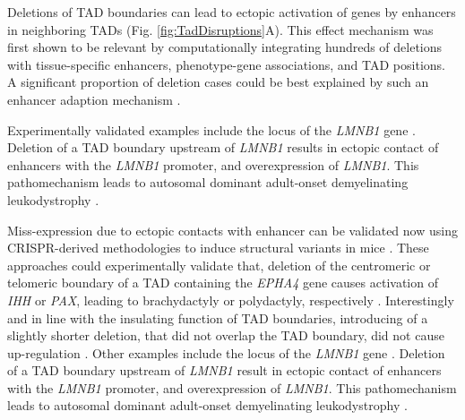 \documentclass[a4paper,twoside=true,openright,parskip=full,chapterprefix=true,11pt,headings=normal,bibliography=totoc,listof=totoc,titlepage=on,captions=tableabove,draft=false]{scrreprt}
\theoremstyle{definition}
\theoremstyle{definition}
\theoremstyle{definition}
\theoremstyle{remark}
\begin{document}
Deletions of TAD boundaries can lead to ectopic activation of genes by
enhancers in neighboring TADs (Fig. \ref{fig:TadDisruptions}A). This
effect mechanism was first shown to be relevant by computationally
integrating hundreds of deletions with tissue-specific enhancers,
phenotype-gene associations, and TAD positions. A significant proportion
of deletion cases could be best explained by such an enhancer adaption
mechanism \citep{Ibn-Salem2014}.

Experimentally validated examples include the locus of the \emph{LMNB1}
gene \citep{Giorgio2015}. Deletion of a TAD boundary upstream of
\emph{LMNB1} results in ectopic contact of enhancers with the
\emph{LMNB1} promoter, and overexpression of \emph{LMNB1}. This
pathomechanism leads to autosomal dominant adult-onset demyelinating
leukodystrophy \citep{Giorgio2015}.

Miss-expression due to ectopic contacts with enhancer can be validated
now using CRISPR-derived methodologies to induce structural variants in
mice \citep{Kraft2015, Andrey2017}. These approaches could
experimentally validate that, deletion of the centromeric or telomeric
boundary of a TAD containing the \emph{EPHA4} gene causes activation of
\emph{IHH} or \emph{PAX}, leading to brachydactyly or polydactyly,
respectively \citep{Lupianez2015}. Interestingly and in line with the
insulating function of TAD boundaries, introducing of a slightly shorter
deletion, that did not overlap the TAD boundary, did not cause
up-regulation \citep{Lupianez2015, Symmons2016}. Other examples include
the locus of the \emph{LMNB1} gene \citep{Giorgio2015}. Deletion of a
TAD boundary upstream of \emph{LMNB1} result in ectopic contact of
enhancers with the \emph{LMNB1} promoter, and overexpression of
\emph{LMNB1}. This pathomechanism leads to autosomal dominant
adult-onset demyelinating leukodystrophy \citep{Giorgio2015}.
\end{document}
